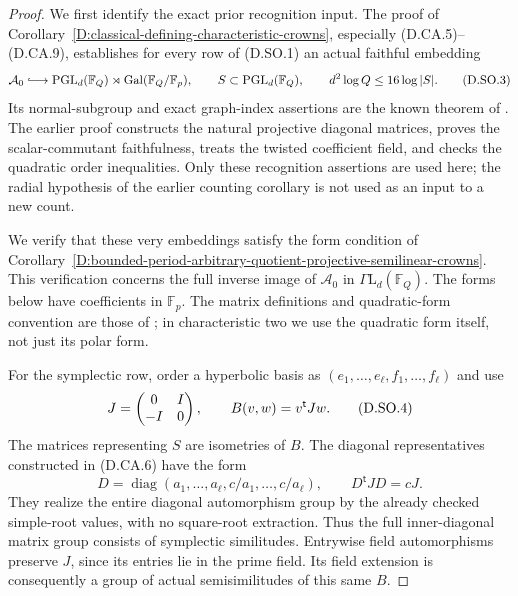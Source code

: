 \begin{proof}
We first identify the exact prior recognition input.
The proof of
Corollary~\ref{D:classical-defining-characteristic-crowns},
especially (D.CA.5)--(D.CA.9), establishes for every
row of (D.SO.1) an actual faithful embedding
\[
 \mathcal A_0\lhook\joinrel\longrightarrow
 \operatorname{PGL}_d(\mathbb F_Q)\rtimes
                   \operatorname{Gal}(\mathbb F_Q/\mathbb F_p),
 \qquad S\subset\operatorname{PGL}_d(\mathbb F_Q),
 \qquad d^2\log Q\le16\log|S|.                         \tag{D.SO.3}
\]
Its normal-subgroup and exact graph-index assertions
are the known theorem of
\citet[Section~2, statements~3.2--3.6 and their
written proofs in Sections~4--7, pp.~607--614]
{Steinberg1960ClassicalAutomorphismsB}.
The earlier proof constructs the natural projective
diagonal matrices, proves the scalar-commutant
faithfulness, treats the twisted coefficient field,
and checks the quadratic order inequalities.
Only these recognition assertions are used here;
the radial hypothesis of the earlier counting
corollary is not used as an input to a new count.

We verify that these very embeddings satisfy the
form condition of
Corollary~\ref{D:bounded-period-arbitrary-quotient-projective-semilinear-crowns}.
This verification concerns the full inverse image
of $\mathcal A_0$ in $\Gamma\mathrm L_d(\mathbb F_Q)$.
The forms below have coefficients in $\mathbb F_p$.
The matrix definitions and quadratic-form convention
are those of \citet[pp.~54--55, 68--70 and 136--139]
{Taylor1992ClassicalB}; in characteristic two we use
the quadratic form itself, not just its polar form.

For the symplectic row, order a hyperbolic basis as
$(e_1,\ldots,e_\ell,f_1,\ldots,f_\ell)$ and use
\[
 J=\begin{pmatrix}0&I\cr-I&0\end{pmatrix},\qquad
 B(v,w)=v^{\mathsf t}Jw.
                                                               \tag{D.SO.4}
\]
The matrices representing $S$ are isometries of $B$.
The diagonal representatives constructed in (D.CA.6)
have the form
\[
 D=\operatorname{diag}(a_1,\ldots,a_\ell,
                         c/a_1,\ldots,c/a_\ell),
             \qquad D^{\mathsf t}JD=cJ.                \tag{D.SO.5}
\]
They realize the entire diagonal automorphism group
by the already checked simple-root values, with no
square-root extraction. Thus the full inner-diagonal
matrix group consists of symplectic similitudes.
Entrywise field automorphisms preserve $J$, since
its entries lie in the prime field. Its field
extension is consequently a group of actual
semisimilitudes of this same $B$.


\end{proof}
